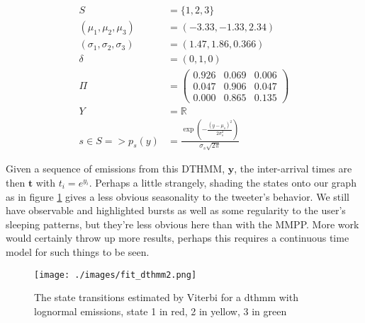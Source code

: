 \begin{align*}
S &= \{1,2,3\}\\
(\mu_1, \mu_2, \mu_3) &= (-3.33, -1.33, 2.34)\\
(\sigma_1, \sigma_2, \sigma_3) &= (1.47, 1.86, 0.366)\\
\delta &= (0,1,0)\\
\Pi &= 
\left(
	\begin{matrix}
     0.926 & 0.069 & 0.006 \\
     0.047 & 0.906 & 0.047 \\
     0.000 & 0.865 & 0.135
	\end{matrix}
\right)\\
Y &= \mathbb{R}\\
s \in S => p_s(y) &= \frac{\exp({-\frac{(y-\mu_s)^2}{2\sigma_s^2}})}{\sigma_s\sqrt{2\pi}}
\end{align*}

Given a sequence of emissions from this DTHMM, $\mathbf{y}$, the inter-arrival times are then $\mathbf{t}$ with $t_i = e^{y_i}$. Perhaps a little strangely, shading the states onto our graph as in figure \ref{fit_dthmm2}
gives a less obvious seasonality to the tweeter's behavior. We still have observable and highlighted bursts as well as some regularity to the user's sleeping patterns, but they're less obvious here than with the MMPP. More work would certainly throw up more results, perhaps this requires a continuous time model for such things to be seen.

\begin{figure}
\texttt{[image: ./images/fit\_dthmm2.png]}
\caption{The state transitions estimated by Viterbi for a dthmm with lognormal emissions, state 1 in red, 2 in yellow, 3 in green}
\label{fit_dthmm2}
\end{figure}

